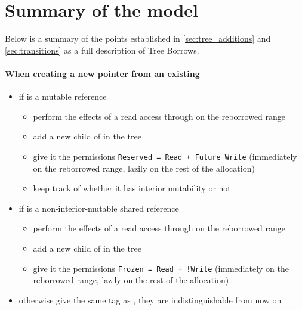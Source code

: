 \documentclass[a4paper,11pt]{article}
\theoremstyle{plain}
\theoremstyle{definition}
\theoremstyle{remark}
\newcommand{\tcode}[1]{\rstinline{#1}}
\newcommand{\tperm}[1]{\texttt{#1}}
\begin{document}
\newpage
\section{Summary of the model}

Below is a summary of the points established in \ref{sec:tree_additions} and \ref{sec:transitions}
as a full description of Tree Borrows.

\paragraph*{When creating a new pointer \tcode{z} from an existing \tcode{y}}
\begin{itemize}
    \item if \tcode{z} is a \tcode{Unpin} mutable reference
        \begin{itemize}
            \item perform the effects of a read access through \tcode{y} on the reborrowed range
            \item add a new child of \tcode{y} in the tree
            \item give it the permissions \tperm{Reserved = Read + Future Write}
                (immediately on the reborrowed range, lazily on the rest of the allocation)
            \item keep track of whether it has interior mutability or not
        \end{itemize}
    \item if \tcode{z} is a non-interior-mutable shared reference
        \begin{itemize}
            \item perform the effects of a read access through \tcode{y} on the reborrowed range
            \item add a new child of \tcode{y} in the tree
            \item give it the permissions \tperm{Frozen = Read + !Write}
                (immediately on the reborrowed range, lazily on the rest of the allocation)
        \end{itemize}
    \item otherwise give \tcode{z} the same tag as \tcode{y}, they are indistinguishable from now on
\end{itemize}
\end{document}
